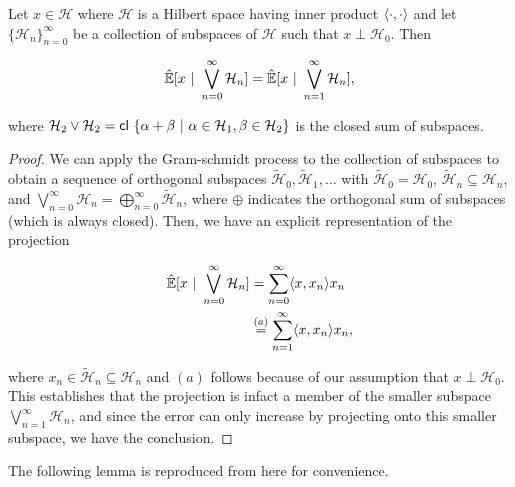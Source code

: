 \documentclass[12pt]{article}
\def\H{\mathcal{H}}  %
\newcommand{\linE}[2]{\hat{\E}[#1\ |\ #2]}  %
\begin{document}
\begin{lemma}
  \label{lem:subspace_sum_projection}
  Let $x \in \H$ where $\H$ is a Hilbert space having inner product $\langle \cdot, \cdot \rangle$ and let $\{\H_n\}_{n = 0}^\infty$ be a collection of subspaces of $\H$ such that $x \perp \H_0$.  Then

  \begin{equation*}
    \linE{x}{\bigvee_{n = 0}^\infty\H_n} = \linE{x}{\bigvee_{n = 1}^\infty\H_n},
  \end{equation*}

  where $\H_2 \vee \H_2 = \cl \{\alpha + \beta\ |\ \alpha \in \H_1, \beta \in \H_2 \}$ is the closed sum of subspaces.
\end{lemma}
\begin{proof}
  We can apply the Gram-schmidt process to the collection of subspaces to obtain a sequence of orthogonal subspaces $\widetilde{\H}_0, \widetilde{\H}_1, \ldots$ with $\widetilde{\H}_0 = \H_0$, $\widetilde{\H}_n \subseteq \H_n$, and $\bigvee_{n = 0}^\infty\H_n = \bigoplus_{n = 0}^\infty \widetilde{\H}_n$, where $\oplus$ indicates the orthogonal sum of subspaces (which is always closed).  Then, we have an explicit representation of the projection

  \begin{align*}
    \linE{x}{\bigvee_{n = 0}^\infty\H_n} &= \sum_{n = 0}^\infty \inner{x}{x_n} x_n\\
    &\overset{(a)}{=} \sum_{n = 1}^\infty \inner{x}{x_n} x_n,
  \end{align*}

  where $x_n \in \widetilde{\H}_n \subseteq \H_n$ and $(a)$ follows because of our assumption that $x \perp \H_0$.  This establishes that the projection is infact a member of the smaller subspace $\bigvee_{n = 1}^\infty\H_n$, and since the error can only increase by projecting onto this smaller subspace, we have the conclusion.
\end{proof}

The following lemma is reproduced from \cite{lindquist} here for convenience.
\end{document}
